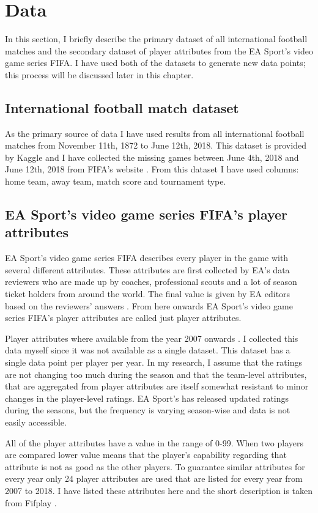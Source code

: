 \section{Data}
In this section, I briefly describe the primary dataset of all international football matches and the secondary dataset of player attributes from the EA Sport's video game series FIFA. I have used both of the datasets to generate new data points; this process will be discussed later in this chapter.

\subsection{International football match dataset}
As the primary source of data I have used results from all international football matches from November 11th, 1872 to June 12th, 2018. This dataset is provided by Kaggle \cite{matchdb} and I have collected the missing games between June 4th, 2018 and June 12th, 2018 from FIFA's website \cite{fifa:matchdata}. From this dataset I have used columns: home team, away team, match score and tournament type.

\subsection{EA Sport’s video game series FIFA's player attributes}
EA Sport's video game series FIFA describes every player in the game with several different attributes. These attributes are first collected by EA's data reviewers who are made up by coaches, professional scouts and a lot of season ticket holders from around the world. The final value is given by EA editors based on the reviewers' answers \cite{playerattr}. From here onwards EA Sport's video game series FIFA's player attributes are called just player attributes.

Player attributes where available from the year 2007 onwards \cite{sofifa}. I collected this data myself since it was not available as a single dataset. This dataset has a single data point per player per year. In my research, I assume that the ratings are not changing too much during the season and that the team-level attributes, that are aggregated from player attributes are itself somewhat resistant to minor changes in the player-level ratings. EA Sport's has released updated ratings during the seasons, but the frequency is varying season-wise and data is not easily accessible.

All of the player attributes have a value in the range of 0-99. When two players are compared lower value means that the player's capability regarding that attribute is not as good as the other players. To guarantee similar attributes for every year only 24 player attributes are used that are listed for every year from 2007 to 2018. I have listed these attributes here and the short description is taken from Fifplay \cite{playerattr}.

